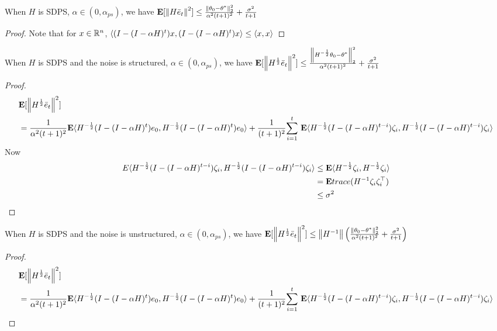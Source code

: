 \begin{theorem}
When $H$ is SDPS, $\alpha \in (0,\alpha_{ps})$, we have
$\E[\norm{H\eb_t}^2]\leq \frac{\norm{\theta_0-\ts}^2_2}{\alpha^2(t+1)^2}+\frac{\sigma^2}{t+1}$
\end{theorem}
\begin{proof}
Note that for $x\in \R^n$, $\ip{(I-(I-\alpha H)^t)x,(I-(I-\alpha H)^t)x}\leq \ip{x,x}$
\end{proof}

\begin{theorem}
When $H$ is SDPS and the noise is structured, $\alpha \in (0,\alpha_{ps})$, we have
$\E[\norm{H^{\frac{1}{2}}\eb_t}^2]\leq \frac{\norm{H^{-\frac{1}{2}}\theta_0-\ts}^2_2}{\alpha^2(t+1)^2}+\frac{\sigma^2}{t+1}$
\end{theorem}
\begin{proof}
\begin{align*}
&\E[\norm{H^{\frac{1}{2}}\eb_t}^2]\\
&=\frac{1}{\alpha^2(t+1)^2}\E\ip{H^{-\frac{1}{2}}(I-(I-\alpha H)^t)e_0,H^{-\frac{1}{2}}(I-(I-\alpha H)^t)e_0}+\frac{1}{(t+1)^2}\ous{\sum}{i=1}{t}\E\ip{H^{-\frac{1}{2}}(I-(I-\alpha H)^{t-i}) \zeta_i,H^{-\frac{1}{2}}(I-(I-\alpha H)^{t-i}) \zeta_i}
\end{align*}
Now
\begin{align*}
E\ip{H^{-\frac{1}{2}}(I-(I-\alpha H)^{t-i}) \zeta_i,H^{-\frac{1}{2}}(I-(I-\alpha H)^{t-i}) \zeta_i}&\leq \E\ip{H^{-\frac{1}{2}}\zeta_i,H^{-\frac{1}{2}}\zeta_i}\\
&=\E trace(H^{-1}\zeta_i\zeta_i^\top)\\
&\leq \sigma^2
\end{align*}
\end{proof}


\begin{theorem}
When $H$ is SDPS and the noise is unstructured, $\alpha \in (0,\alpha_{ps})$, we have
$\E[\norm{H^{\frac{1}{2}}\eb_t}^2]\leq \norm{H^{-1}} \Big(\frac{\norm{\theta_0-\ts}^2_2}{\alpha^2(t+1)^2}+\frac{\sigma^2}{t+1}\Big)$
\end{theorem}
\begin{proof}
\begin{align*}
&\E[\norm{H^{\frac{1}{2}}\eb_t}^2]\\
&=\frac{1}{\alpha^2(t+1)^2}\E\ip{H^{-\frac{1}{2}}(I-(I-\alpha H)^t)e_0,H^{-\frac{1}{2}}(I-(I-\alpha H)^t)e_0}+\frac{1}{(t+1)^2}\ous{\sum}{i=1}{t}\E\ip{H^{-\frac{1}{2}}(I-(I-\alpha H)^{t-i}) \zeta_i,H^{-\frac{1}{2}}(I-(I-\alpha H)^{t-i}) \zeta_i}
\end{align*}
\end{proof}



